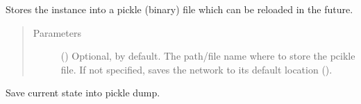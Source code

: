 \documentclass[letterpaper,10pt,english]{sphinxmanual}
\begin{document}
\begin{fulllineitems}
\begin{fulllineitems}
Stores the instance into a pickle (binary) file which can be
reloaded in the future.
\begin{quote}\begin{description}
\item[{Parameters}] \leavevmode
{} () \textendash{} Optional,  by default. The path/file name where to
store the pcikle file. If not specified, saves the network
to its default location
().

\end{description}\end{quote}

\end{fulllineitems}


\begin{fulllineitems}
\label{\detokenize{main:pypath.main.PyPath.save_session}}
Save current state into pickle dump.

\end{fulllineitems}


\begin{fulllineitems}
\label{\detokenize{main:pypath.main.PyPath.search_attr_and}}
\end{fulllineitems}


\begin{fulllineitems}
\label{\detokenize{main:pypath.main.PyPath.search_attr_or}}
\end{fulllineitems}


\begin{fulllineitems}
\label{\detokenize{main:pypath.main.PyPath.second_neighbours}}
\end{fulllineitems}


\end{fulllineitems}
\end{document}
